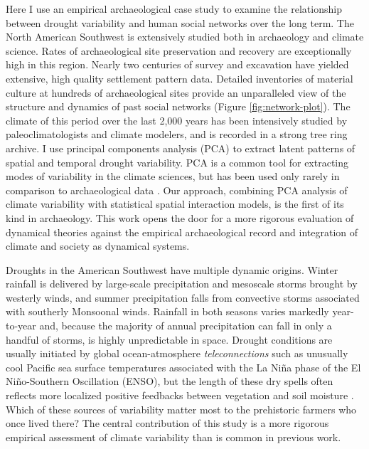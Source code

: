 \documentclass[10pt]{iopart}
\begin{document}
Here I use an empirical archaeological case study to examine the relationship between drought variability and human social networks over the long term. The North American Southwest is extensively studied both in archaeology and climate science. Rates of archaeological site preservation and recovery are exceptionally high in this region. Nearly two centuries of survey and excavation have yielded extensive, high quality settlement pattern data. Detailed inventories of material culture at hundreds of archaeological sites provide an unparalleled view of the structure and dynamics of past social networks (Figure \ref{fig:network-plot}). The climate of this period over the last 2,000 years has been intensively studied by paleoclimatologists and climate modelers, and is recorded in a strong tree ring archive. I use principal components analysis (PCA) to extract latent patterns of spatial and temporal drought variability. PCA is a common tool for extracting modes of variability in the climate sciences, but has been used only rarely in comparison to archaeological data \parencite{Weiss1982,vanwest}. Our approach, combining PCA analysis of climate variability with statistical spatial interaction models, is the first of its kind in archaeology. This work opens the door for a more rigorous evaluation of dynamical theories against the empirical archaeological record and integration of climate and society as dynamical systems.

Droughts in the American Southwest have multiple dynamic origins. Winter rainfall is delivered by large-scale precipitation and mesoscale storms brought by westerly winds, and summer precipitation falls from convective storms associated with southerly Monsoonal winds. Rainfall in both seasons varies markedly year-to-year and, because the majority of annual precipitation can fall in only a handful of storms, is highly unpredictable in space. Drought conditions are usually initiated by global ocean-atmosphere \textit{teleconnections} such as unusually cool Pacific sea surface temperatures associated with the La Ni\~{n}a phase of the El Ni\~{n}o-Southern Oscillation (ENSO), but the length of these dry spells often reflects more localized positive feedbacks between vegetation and soil moisture \parencite{Koster2004RegionsPrecipitation,Ault2014AssessingData}. Which of these sources of variability matter most to the prehistoric farmers who once lived there? The central contribution of this study is a more rigorous empirical assessment of climate variability than is common in previous work.
\end{document}
